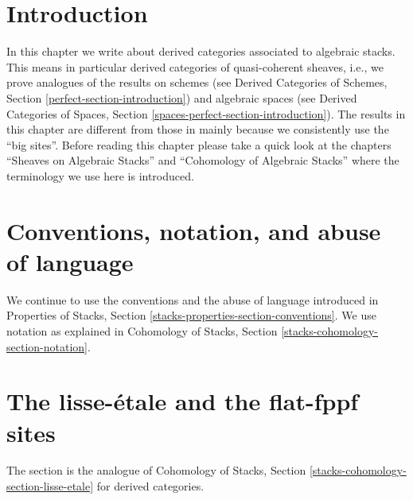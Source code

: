 \section{Introduction}
\label{stacks-perfect-section-introduction}
In this chapter we write about derived categories associated to
algebraic stacks. This means in particular derived categories
of quasi-coherent sheaves, i.e., we prove analogues of the results
on schemes (see
Derived Categories of Schemes, Section \ref{perfect-section-introduction})
and algebraic spaces (see
Derived Categories of Spaces, Section
\ref{spaces-perfect-section-introduction}). The results in this chapter
are different from those in \cite{LM-B} mainly because we consistently
use the ``big sites''. Before reading this chapter please take a quick
look at the chapters ``Sheaves on Algebraic Stacks'' and
``Cohomology of Algebraic Stacks'' where the terminology we use here is
introduced.

\section{Conventions, notation, and abuse of language}
\label{stacks-perfect-section-conventions}
We continue to use the conventions and the abuse of language
introduced in
Properties of Stacks, Section \ref{stacks-properties-section-conventions}.
We use notation as explained in
Cohomology of Stacks, Section \ref{stacks-cohomology-section-notation}.

\section{The lisse-\'etale and the flat-fppf sites}
\label{stacks-perfect-section-lisse-etale}
The section is the analogue of
Cohomology of Stacks, Section \ref{stacks-cohomology-section-lisse-etale}
for derived categories.

